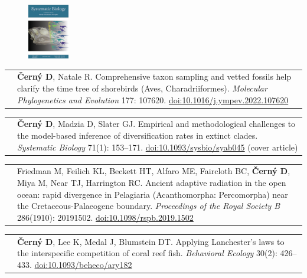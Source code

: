 \documentclass[10pt]{article}
\begin{document}
\begin{figure}
 \begin{center}
   \includegraphics[width=0.16\textwidth]{SysBioCover.png}
 \end{center}
\end{figure}

\noindent \begin{tabularx}{\textwidth}{>{\raggedleft\arraybackslash}p{2.2cm} X}
2022 & \textbf{\v{C}ern\'{y} D}, Natale R. Comprehensive taxon sampling and vetted fossils help clarify the time tree of shorebirds (Aves, Charadriiformes). \textit{Molecular Phylogenetics and Evolution} 177: 107620. \href{http://doi.org/10.1016/j.ympev.2022.107620}{doi:10.1016/j.ympev.2022.107620}
\end{tabularx}
\begin{tabularx}{\textwidth}{>{\raggedleft\arraybackslash}p{2.2cm} p{10.5cm}}
2021 & \textbf{\v{C}ern\'{y} D}, Madzia D, Slater GJ. Empirical and methodological challenges to the model-based inference of diversification rates in extinct clades. \textit{Systematic Biology} 71(1): 153--171. \href{http://doi.org/10.1093/sysbio/syab045}{doi:10.1093/sysbio/syab045} (cover article)
\end{tabularx}
\begin{tabularx}{\textwidth}{>{\raggedleft\arraybackslash}p{2.2cm} p{10.5cm}}
2019 & Friedman M, Feilich KL, Beckett HT, Alfaro ME, Faircloth BC, \textbf{\v{C}ern\'{y} D}, Miya M, Near TJ, Harrington RC. Ancient adaptive radiation in the open ocean: rapid divergence in Pelagiaria (Acanthomorpha: Percomorpha) near the Cretaceous-Palaeogene boundary. \textit{Proceedings of the Royal Society B} 286(1910): 20191502. \href{http://doi.org/10.1098/rspb.2019.1502}{doi:10.1098/rspb.2019.1502}
\end{tabularx}
\begin{tabularx}{\textwidth}{>{\raggedleft\arraybackslash}p{2.2cm} X}
2018 & \textbf{\v{C}ern\'{y} D}, Lee K, Medal J, Blumstein DT. Applying Lanchester's laws to the interspecific competition of coral reef fish. \textit{Behavioral Ecology} 30(2): 426--433. \href{http://doi.org/10.1093/beheco/ary182}{doi:10.1093/beheco/ary182}
\end{tabularx}
\end{document}
